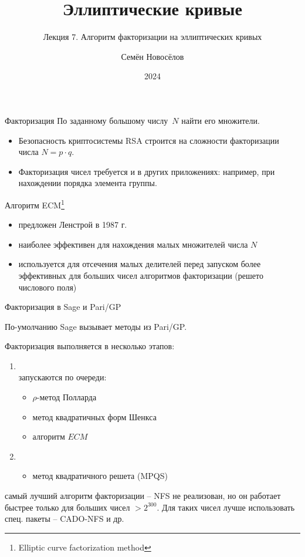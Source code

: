 \documentclass{beamer}
\title{Эллиптические кривые}
\subtitle{Лекция 7. Алгоритм факторизации на эллиптических кривых}
\author{Семён Новосёлов}
\institute{БФУ им. И. Канта}
\date{2024}
\begin{document}
\frame{\titlepage}

\begin{frame}{Факторизация}
	По заданному большому числу~$N$ найти его множители.

	\vspace{1em}

	\begin{itemize}
		\item Безопасность криптосистемы RSA строится на сложности факторизации числа $N = p \cdot q$.
		\vspace{0.5em}
		\item Факторизация чисел требуется и в других приложениях: например, при нахождении порядка элемента группы.
	\end{itemize}
\end{frame}

\begin{frame}{Алгоритм ECM\footnote{Elliptic curve factorization method}}
	\begin{itemize}
		\item предложен Ленстрой в 1987 г.
		\item наиболее эффективен для нахождения малых множителей числа $N$
		\item используется для отсечения малых делителей перед запуском более эффективных для больших чисел алгоритмов факторизации (решето числового поля)
	\end{itemize}
\end{frame}

\begin{frame}{Факторизация в Sage и Pari/GP}
	
	По-умолчанию Sage вызывает методы из Pari/GP.
	\vspace{1em}

	Факторизация выполняется в несколько этапов:
	\vspace{0.5em}
	\begin{enumerate}
		\item {}\\запускаются по очереди:
		\begin{itemize}
			\item $\rho$-метод Полларда
			\item метод квадратичных форм Шенкса
			\item алгоритм $ECM$
		\end{itemize}
		\vspace{0.5em}
		\item  {}
		\begin{itemize}
			\item метод квадратичного решета (MPQS)
		\end{itemize} 
	\end{enumerate}
	
	\vspace{3em}
	\begin{small}
		 самый лучший алгоритм факторизации -- NFS не реализован, но он работает быстрее только для больших чисел $> 2^{300}$. Для таких чисел лучше использовать спец. пакеты -- CADO-NFS и др.
	\end{small}
\end{frame}
\end{document}
